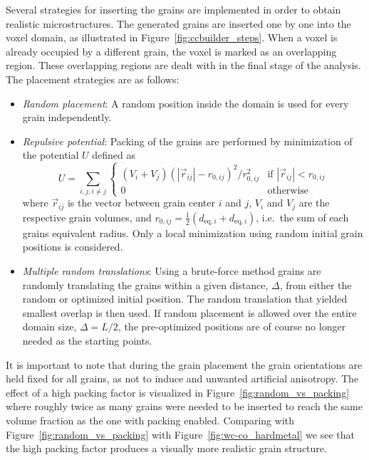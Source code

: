 \documentclass[3p,12pt]{elsarticle}
\begin{document}
Several strategies for inserting the grains are implemented in order to obtain realistic microstructures. 
The generated grains are inserted one by one into the voxel domain, as illustrated in Figure~\ref{fig:ccbuilder_steps}.
When a voxel is already occupied by a different grain, the voxel is marked as an overlapping region.
These overlapping regions are dealt with in the final stage of the analysis.
The placement strategies are as follows:
%
\begin{itemize}
 \item \emph{Random placement}: A random position inside the domain is used for every grain independently.

 \item \emph{Repulsive potential}:
 Packing of the grains are performed by minimization of the potential $U$ defined as
\begin{equation}
  U = \sum_{i,j,i\neq j} \begin{cases}
	(V_i + V_j) (\left| \vec{r}_{ij} \right| - r_{0,ij})^2 / r_{0,ij}^2 & \text{if } \left|\vec{r}_{ij}\right| < r_{0,ij}
	\\
	0 & \text{otherwise}
      \end{cases}
  \label{eq:potential}
\end{equation}
 where $\vec{r}_{ij}$ is the vector between grain center $i$ and $j$, $V_i$ and $V_j$ are the respective grain volumes, and $r_{0,ij} = \frac12(d_{\text{eq},i}+d_{\text{eq},i})$, i.e.\ the sum of each grains equivalent radius.
 Only a local minimization using random initial grain positions is considered.
 
 \item \emph{Multiple random translations}:
 Using a brute-force method grains are randomly translating the grains within a given distance, $\Delta$, from either the random or optimized initial position.
 The random translation that yielded smallest overlap is then used.
 If random placement is allowed over the entire domain size, $\Delta = L/2$, the pre-optimized positions are of course no longer needed as the starting points.

\end{itemize}
It is important to note that during the grain placement the grain orientations are held fixed for all grains, as not to induce and unwanted artificial anisotropy.
The effect of a high packing factor is visualized in Figure~\ref{fig:random_vs_packing} where roughly twice as many grains were needed to be inserted to reach the same volume fraction as the one with packing enabled.
Comparing with Figure~\ref{fig:random_vs_packing} with Figure~\ref{fig:wc-co_hardmetal} we see that the high packing factor produces a visually more realistic grain structure.
\end{document}
